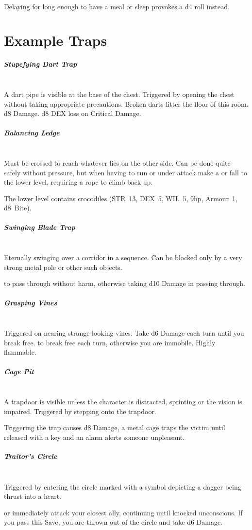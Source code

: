 \documentclass[itdr]{subfiles}
\begin{document}
Delaying for long enough to have a meal or sleep provokes a d4 roll instead.

\section{Example Traps}

\subparagraph{Stupefying Dart Trap}~\\
A dart pipe is visible at the base of the chest. Triggered by opening the chest without taking appropriate precautions. Broken darts litter the floor of this room.
d8 Damage. d8 DEX loss on Critical Damage.

\subparagraph{Balancing Ledge}~\\
Must be crossed to reach whatever lies on the other side. Can be done quite safely without pressure, but when having to run or under attack make a  or fall to the lower level, requiring a rope to climb back up.

The lower level contains crocodiles (STR~13, DEX~5, WIL~5, 9hp, Armour~1, d8~Bite).

\subparagraph{Swinging Blade Trap}~\\
Eternally swinging over a corridor in a sequence. Can be blocked only by a very strong metal pole or other such objects.

 to pass through without harm, otherwise taking d10 Damage in passing through.

\subparagraph{Grasping Vines}~\\
Triggered on nearing strange-looking vines. Take d6 Damage each turn until you break free.  to break free each turn, otherwise you are immobile. Highly flammable.

\subparagraph{Cage Pit}~\\
A trapdoor is visible unless the character is distracted, sprinting or the vision is impaired. Triggered by stepping onto the trapdoor.

Triggering the trap causes d8 Damage, a metal cage traps the victim until released with a key and an alarm alerts someone unpleasant.

\subparagraph{Traitor's Circle}~\\
Triggered by entering the circle marked with a symbol depicting a dagger being thrust into a heart.

 or immediately attack your closest ally, continuing until knocked unconscious. If you pass this Save, you are thrown out of the circle and take d6 Damage.
\end{document}
